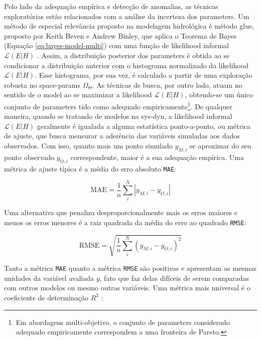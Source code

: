 \documentclass[./main.tex]{subfiles}
\begin{document}
\par Pelo lado da adequação empírica e detecção de anomalias, as técnicas exploratórias estão relacionados com a análise da incerteza dos \gls{parameters}. Um método de especial relevância proposto na modelagem hidrológica é método \acrfull{glue}, proposto por Keith Beven e Andrew Binley, que aplica o Teorema de Bayes (Equação \eqref{eq:bayes-model-multi}) com uma função de \gls{likelihood} informal $\mathcal{L}(E|H)$ \cite{beven1992}. Assim, a distribuição posterior dos \gls{parameters} é obtida ao se condicionar a distribuição anterior com o histograma normalizado da \gls{likelihood} $\mathcal{L}(E|H)$. Esse histograma, por sua vez, é calculado a partir de uma exploração robusta no \gls{space-params} $\Omega_{\Theta}$. As técnicas de busca, por outro lado, atuam no sentido de  o \gls{model} ao se maximizar a \gls{likelihood} $\mathcal{L}(E|H)$, obtendo-se um único conjunto de \gls{parameters} tido como adequado empiricamente\footnote{Em abordagens multi-objetivo, o conjunto de \gls{parameters} considerado adequado empiricamente correspondem a uma fronteira de Pareto.}. De qualquer maneira, quando se tratando de modelos na \gls{sys-dyn}, a \gls{likelihood} informal $\mathcal{L}(E|H)$ geralmente é igualada a alguma estatística ponto-a-ponto, ou métrica de ajuste, que busca mensurar a aderência das variáveis simuladas aos dados observados. Com isso, quanto mais um ponto simulado $y_{M, i}$ se aproximar do seu ponto observado $y_{O, i}$ correspondente, maior é a sua adequação empírica. Uma métrica de ajuste típica é a média do erro absoluto \texttt{MAE}:
\begin{linenomath*}
\begin{equation} 
	\label{eq:mae}
 \text{MAE} = \frac{1}{n}\sum_{i}^{N} |y_{M, i} - y_{O, i}| 
\end{equation}
\end{linenomath*}
Uma alternativa que penaliza desproporcionalmente mais os erros maiores e menos os erros menores é a raiz quadrada da média do erro ao quadrado \texttt{RMSE}:
\begin{linenomath*}
\begin{equation} 
	\label{eq:rmse}
 \text{RMSE} = \sqrt{\frac{1}{n}\sum_{i}^{N} (y_{M, i} - y_{O, i})^2}  
\end{equation}
\end{linenomath*}
Tanto a métrica \texttt{MAE} quanto a métrica \texttt{RMSE} são positivas e apresentam as mesmas unidades da variável avaliada $y$, fato que faz delas difíceis de serem comparadas com outros modelos ou mesmo outras variáveis. Uma métrica mais universal é o coeficiente de determinação $R^2$ \cite{glantz2001}: 
\end{document}
